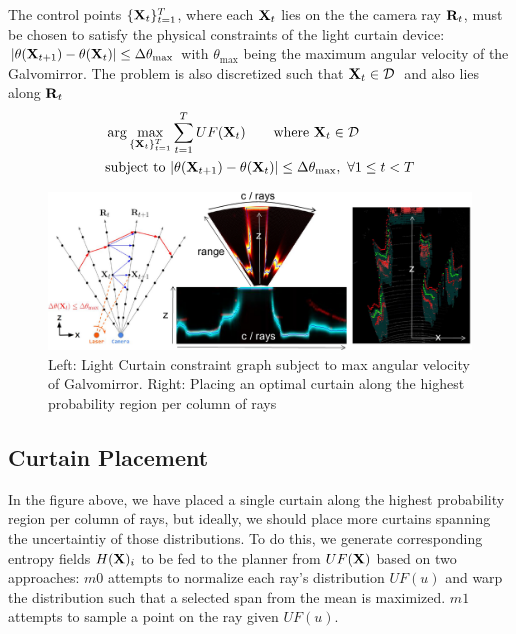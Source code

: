 The control points $\{\mathbf{X}_t\}_{t=1}^T$, where each $\mathbf{X}_t$ lies on the the camera ray $\mathbf{R}_t$, must be chosen to satisfy the physical constraints of the light curtain device: $|\theta(\mathbf{X}_{t+1}) - \theta(\mathbf{X}_t)| \leq \Delta \theta_\text{max}$ with $\theta_\text{max}$ being the maximum angular velocity of the Galvomirror. The problem is also discretized such that $\X_{t} \in \D\ $ and also lies along $\mathbf{R}_t$
\begin{align}
    &\arg \max_{\{\mathbf{X}_t\}_{t=1}^T} \sum_{t=1}^T UF(\mathbf{X}_t) \qquad \text{where}\ \mathbf{X}_t \in \mathcal{D}\ \nonumber\\
    &\text{subject to}\ |\theta(\mathbf{X}_{t+1}) - \theta(\mathbf{X}_t)| \leq \Delta \theta_\text{max},\ \forall 1 \leq t < T
    \label{eq:constraint}
\end{align}

\begin{figure}[h]
   \centering
   \begin{minipage}{0.5\textwidth}
       \centering
       \includegraphics[width=1.0\textwidth]{figures/planner.pdf}
   \end{minipage}\hfill
   \centering
   \caption{Left: Light Curtain constraint graph subject to max angular velocity of Galvomirror. Right: Placing an optimal curtain along the highest probability region per column of rays}
\end{figure}

\subsection{Curtain Placement}

In the figure above, we have placed a single curtain along the highest probability region per column of rays, but ideally, we should place more curtains spanning the uncertaintiy of those distributions. To do this, we generate corresponding entropy fields $H(\mathbf{X})_{i}$ to be fed to the planner from $UF(\mathbf{X})$ based on two approaches: $m0$ attempts to normalize each ray's distribution $UF(u)$ and warp the distribution such that a selected span from the mean is maximized. $m1$ attempts to sample a point on the ray given $UF(u)$. 

